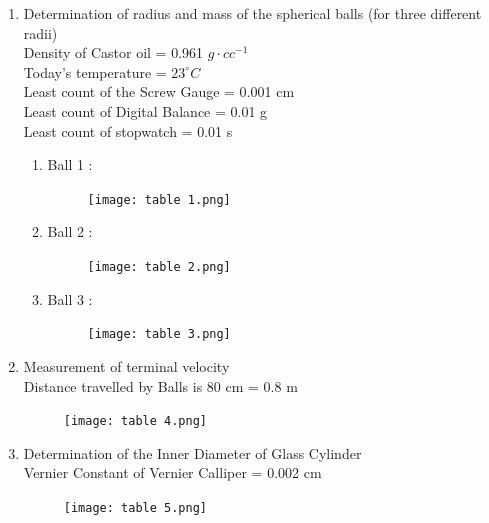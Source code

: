 \documentclass{article}
\begin{document}
	\begin{enumerate}
		\item Determination of radius and mass of the spherical balls (for three different radii)\\
		Density of Castor oil = 0.961 $g \cdot cc^{-1}$\\
		Today's temperature = $23 ^{\circ} C$\\
		Least count of the Screw Gauge = 0.001 cm\\
		Least count of Digital Balance = 0.01 g\\
		Least count of stopwatch = 0.01 s\\
		
		\begin{enumerate}
			\item Ball 1 :
			\begin{figure}[H]
				\centering
				\texttt{[image: table 1.png]}
			\end{figure}
		
			\item Ball 2 :
			\begin{figure}[H]
				\centering
				\texttt{[image: table 2.png]}
			\end{figure}
		
			\pagebreak
		
			\item Ball 3 :
			\begin{figure}[H]
				\centering
				\texttt{[image: table 3.png]}
			\end{figure}
		\end{enumerate}
	
	\item Measurement of terminal velocity\\
	Distance travelled by Balls is 80 cm = 0.8 m\\
	
	\begin{figure}[H]
		\centering
		\texttt{[image: table 4.png]}
	\end{figure}

	\item Determination of the Inner Diameter of Glass Cylinder\\
	Vernier Constant of Vernier Calliper = 0.002 cm\\
	
	\begin{figure}[H]
		\centering
		\texttt{[image: table 5.png]}
	\end{figure}
	\end{enumerate}
\end{document}

